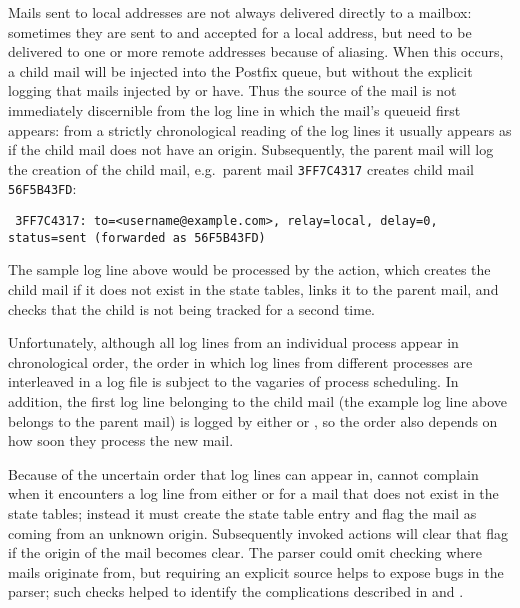 Mails sent to local addresses are not always delivered directly to a
mailbox: sometimes they are sent to and accepted for a local address, but
need to be delivered to one or more remote addresses because of aliasing.
When this occurs, a child mail will be injected into the Postfix queue, but
without the explicit logging that mails injected by  or
 have.  Thus the source of the mail is not immediately
discernible from the log line in which the mail's queueid first appears:
from a strictly chronological reading of the log lines it usually appears
as if the child mail does not have an origin.  Subsequently, the parent
mail will log the creation of the child mail, e.g.\ parent mail
\texttt{3FF7C4317} creates child mail \texttt{56F5B43FD}\@:

\texttt{\tab{} 3FF7C4317: to=<username@example.com>, relay=local, \hfill{}
\newline{} \tab{} \tab{} \tab{} delay=0, status=sent (forwarded as
56F5B43FD)}

The sample log line above would be processed by the  action,
which creates the child mail if it does not exist in the state tables,
links it to the parent mail, and checks that the child is not being tracked
for a second time.

Unfortunately, although all log lines from an individual process appear in
chronological order, the order in which log lines from different processes
are interleaved in a log file is subject to the vagaries of process
scheduling.  In addition, the first log line belonging to the child mail
(the example log line above belongs to the parent mail) is logged by either
 or , so the order also depends on how soon
they process the new mail.

Because of the uncertain order that log lines can appear in, \parsername{}
cannot complain when it encounters a log line from either  or
 for a mail that does not exist in the state tables;
instead it must create the state table entry and flag the mail as coming
from an unknown origin.  Subsequently invoked actions will clear that flag
if the origin of the mail becomes clear.  The parser could omit checking
where mails originate from, but requiring an explicit source helps to
expose bugs in the parser; such checks helped to identify the complications
described in  and
.

